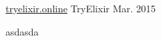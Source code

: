

\begin{cventries}

  \cventry
    {\href{http://tryelixir.online}{tryelixir.online}} %
    {TryElixir} %
    {} %
    {Mar. 2015} %
    {
      \begin{cvitems} %
        \item {asdasda}
      \end{cvitems}
    }

\end{cventries}
